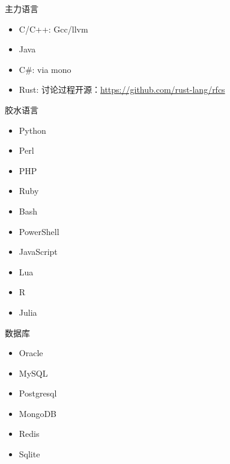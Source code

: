 \documentclass{beamer}
\begin{document}
\begin{frame}[t]{主力语言}
\begin{block}{}
\begin{itemize}
\item C/C++: Gcc/llvm
\item Java 
\item C\#: via mono
\item Rust: 讨论过程开源：\url{https://github.com/rust-lang/rfcs} 
\end{itemize}
\end{block}
\end{frame}

\begin{frame}[t]{胶水语言}
\begin{block}{}
\begin{itemize}
\item Python
\item Perl
\item PHP
\item Ruby
\item Bash
\item PowerShell
\item JavaScript
\item Lua
\item R
\item Julia 
\end{itemize}
\end{block}
\end{frame}

\begin{frame}[t]{数据库}
\begin{block}{}
\begin{itemize}
\item Oracle
\item MySQL
\item Postgresql
\item MongoDB
\item Redis
\item Sqlite 
\end{itemize}
\end{block}
\end{frame}
\end{document}
